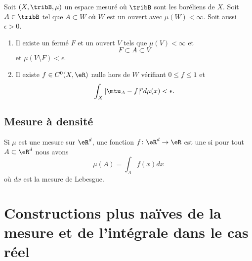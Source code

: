 \begin{theorem}     \label{ThoAFXXcVa}
    Soit \( (X,\tribB,\mu)\) un espace mesuré où \( \tribB\) sont les boréliens de \( X\). Soit \( A\in \tribB\) tel que \( A\subset W\) où \( W\) est un ouvert avec \( \mu(W)<\infty\). Soit aussi \( \epsilon>0\).
    \begin{enumerate}
        \item
            Il existe un fermé \( F\) et un ouvert \( V\) tels que \( \mu(V)<\infty\) et
            \begin{equation}
                F\subset A\subset V
            \end{equation}
            et \( \mu(V\setminus F)<\epsilon\).
        \item
            Il existe \( f\in C^0(X,\eR)\) nulle hors de \( W\) vérifiant \( 0\leq f\leq 1\) et
            \begin{equation}
                \int_X| \mtu_A-f |^pd\mu(x)<\epsilon.
            \end{equation}
    \end{enumerate}
\end{theorem}

\subsection{Mesure à densité}

Si \( \mu\) est une mesure sur \( \eR^d\), une fonction \( f\colon \eR^d\to \eR\) est une  si pour tout \( A\subset\eR^d\) nous avons
\begin{equation}
    \mu(A)=\int_Af(x)dx
\end{equation}
où \( dx\) est la mesure de Lebesgue.

\section{Constructions plus naïves de la mesure et de l'intégrale dans le cas réel}

